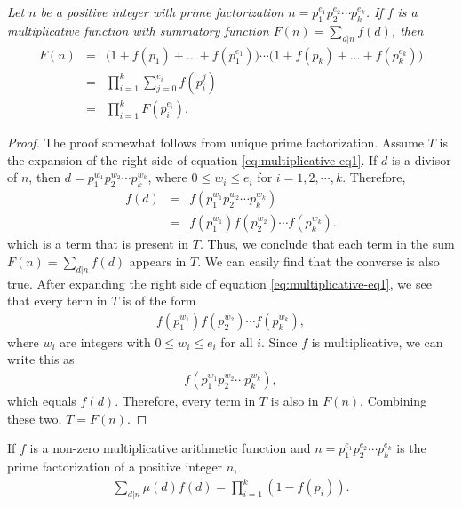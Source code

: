 \documentclass[12pt]{subfile}
\begin{document}
		\begin{theorem}\slshape\label{thm:sumfunction}
			Let $n$ be a positive integer with prime factorization $n=p_1^{e_1}p_2^{e_2} \cdots p_k^{e_k}$. If $f$ is a multiplicative function with summatory function $F(n)=\sum\limits_{d|n}f(d)$, then
				\begin{eqnarray}
					F(n)
					& = &
					\Big(1+f(p_1)+\ldots+f\left(p_1^{e_1}\right)\Big)\cdots\Big(1+f(p_k)+\ldots+f\left(p_k^{e_k}\right)\Big) \label{eq:multiplicative-eq1}\\
					& = &
					\prod_{i=1}^k\sum_{j=0}^{e_i}f\left(p_i^j\right) \nonumber\\
					& = & \prod_{i=1}^kF\left(p_i^{e_i}\right).\nonumber
				\end{eqnarray}
		\end{theorem}

		\begin{proof}
			The proof somewhat follows from unique prime factorization. Assume $T$ is the expansion of the right side of equation \ref{eq:multiplicative-eq1}.
			If $d$ is a divisor of $n$, then $d=p_1^{w_1}p_2^{w_2}\cdots p_k^{w_k}$, where $0\leq w_i\leq e_i$ for $i=1,2,\cdots,k$. Therefore,
				\begin{eqnarray*}
					f(d)    & = & f\left(p_1^{w_1}p_2^{w_2}\cdots p_k^{w_k}\right)\\
							& = & f\left(p_1^{w_1}\right) f\left(p_2^{w_2}\right)\cdots f\left(p_k^{w_k}\right).
				\end{eqnarray*}
			which is a term that is present in $T$. Thus, we conclude that each term in the sum $F(n)=\sum\limits_{d|n}f(d)$ appears in $T$. We can easily find that the converse is also true. After expanding the right side of equation \ref{eq:multiplicative-eq1}, we see that every term in $T$ is of the form
				\begin{align*}
					f\left(p_1^{w_1}\right)	f\left(p_2^{w_2}\right)\cdots f\left(p_k^{w_k}\right),
				\end{align*}
			where $w_i$ are integers with $0 \leq w_i \leq e_i$ for all $i$. Since $f$ is multiplicative, we can write this as
				\begin{align*}
					f\left(p_1^{w_1}p_2^{w_2}\cdots p_k^{w_k}\right),
				\end{align*}
			which equals $f(d)$. Therefore, every term in $T$ is also in $F(n)$. Combining these two, $T=F(n)$.
		\end{proof}



		\begin{corollary}
			If $f$ is a non-zero multiplicative arithmetic function and $n=p_1^{e_1}p_2^{e_2} \cdots p_k^{e_k}$ is the prime factorization of a positive integer $n$,
				\begin{align*}
					\sum\limits_{d|n}\mu(d)f(d) = \prod_{i=1}^{k} (1-f(p_i)).
				\end{align*}
		\end{corollary}
\end{document}
